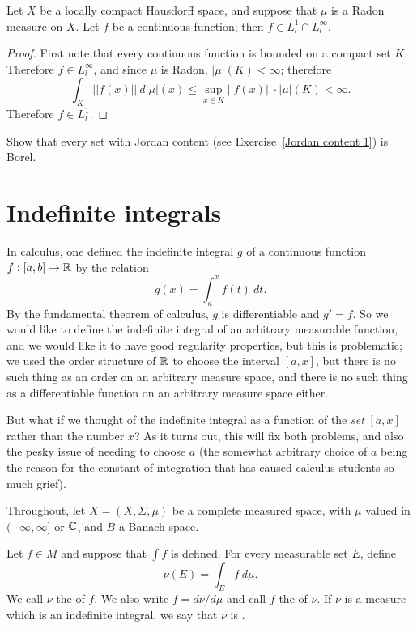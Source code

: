 \begin{lemma}
Let $X$ be a locally compact Hausdorff space, and suppose that $\mu$ is a Radon measure on $X$.
Let $f$ be a continuous function; then $f \in L^{1}_{l} \cap L^{\infty}_{l}$.
\end{lemma}
\begin{proof}
First note that every continuous function is bounded on a compact set $K$.
Therefore $f \in L^{\infty}_{l}$, and since $\mu$ is Radon, $|\mu|(K) < \infty$; therefore
\[\int_{K} ||f(x)||~d|\mu|(x) \leq \sup_{x \in K} ||f(x)||\cdot |\mu|(K) < \infty.\]
Therefore $f \in L^{1}_{l}$.
\end{proof}

\begin{exercise}
Show that every set with Jordan content (see Exercise~\ref{Jordan content 1}) is Borel.
\end{exercise}

\section{Indefinite integrals}
In calculus, one defined the indefinite integral $g$ of a continuous function $f: [a, b] \to \mathbb{R}$ by the relation
\[g(x) = \int_{a}^{x} f(t)~dt.\]
By the fundamental theorem of calculus, $g$ is differentiable and $g' = f$.
So we would like to define the indefinite integral of an arbitrary measurable function, and we would like it to have good regularity properties, but this is problematic; we used the order structure of $\mathbb{R}$ to choose the interval $[a, x]$, but there is no such thing as an order on an arbitrary measure space, and there is no such thing as a differentiable function on an arbitrary measure space either.

But what if we thought of the indefinite integral as a function of the \emph{set} $[a, x]$ rather than the number $x$?
As it turns out, this will fix both problems, and also the pesky issue of needing to choose $a$ (the somewhat arbitrary choice of $a$ being the reason for the constant of integration that has caused calculus students so much grief).

\begin{subsec}
Throughout, let $X = (X, \Sigma, \mu)$ be a complete measured space, with $\mu$ valued in $(-\infty, \infty]$ or $\mathbb{C}$, and $B$ a Banach space.
\end{subsec}

\begin{definition}
Let $f \in M$ and suppose that $\int f$ is defined. For every measurable set $E$, define
\[\nu(E) = \int_{E} f~d\mu.\]
We call $\nu$ the  of $f$.
We also write $f = d\nu/d\mu$ and call $f$ the  of $\nu$.
If $\nu$ is a measure which is an indefinite integral, we say that $\nu$ is .
\end{definition}

